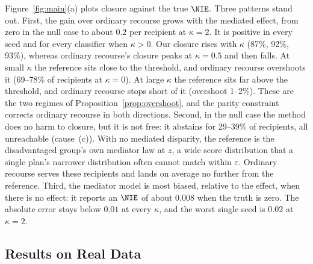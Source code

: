 Figure~\ref{fig:main}(a) plots closure against the true $\NIE$.
Three patterns stand out. First, the gain over ordinary recourse grows with
the mediated effect, from zero in the null case to about $0.2$ per recipient
at $\kappa=2$. It is positive in every seed and for every classifier when
$\kappa>0$. Our closure rises with $\kappa$ (87\%, 92\%, 93\%), whereas
ordinary recourse's closure peaks at $\kappa=0.5$ and then falls. At small
$\kappa$ the reference sits close to the threshold, and ordinary recourse
overshoots it (69--78\% of recipients at $\kappa=0$). At large $\kappa$ the
reference sits far above the threshold, and ordinary recourse stops short of
it (overshoot 1--2\%). These are the two regimes of
Proposition~\ref{prop:overshoot}, and the parity constraint corrects
ordinary recourse in both directions.
Second, in the null case the method does no harm to closure, but it is not
free: it abstains for 29--39\% of recipients, all unreachable (cause~(c)).
With no mediated disparity, the reference is the disadvantaged group's own
mediator law at $z$, a wide score distribution that a single plan's narrower
distribution often cannot match within $\varepsilon$. Ordinary recourse
serves these recipients and lands on average no further from the reference.
Third, the mediator model is most biased, relative to the effect, when there
is no effect: it reports an $\NIE$ of about $0.008$ when the truth is zero. The
absolute error stays below $0.01$ at every $\kappa$, and the worst single
seed is $0.02$ at $\kappa=2$.

\subsection{Results on Real Data}
\label{sec:exp_real}

